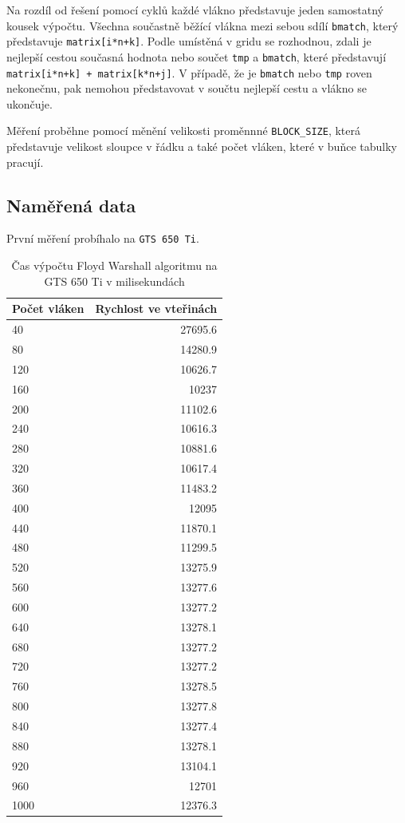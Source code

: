 \documentclass[10pt,a4paper]{article}
\begin{document}
Na rozdíl od řešení pomocí cyklů každé vlákno představuje jeden samostatný kousek výpočtu. Všechna součastně běžící vlákna mezi sebou sdílí \texttt{bmatch}, který představuje \texttt{matrix[i*n+k]}. Podle umístěná v gridu se rozhodnou, zdali je nejlepší cestou současná hodnota nebo součet \texttt{tmp} a \texttt{bmatch}, které představují \texttt{matrix[i*n+k] + matrix[k*n+j]}. V případě, že je \texttt{bmatch} nebo \texttt{tmp} roven nekonečnu, pak nemohou představovat v součtu nejlepší cestu a vlákno se ukončuje.

Měření proběhne pomocí měnění velikosti proměnnné \texttt{BLOCK\_SIZE}, která představuje velikost sloupce v řádku a také počet vláken, které v buňce tabulky pracují.

\subsection{Naměřená data}

První měření probíhalo na \texttt{GTS 650 Ti}. 

\begin{table}[H]
  \centering
	\caption{Čas výpočtu Floyd Warshall algoritmu na GTS 650 Ti v milisekundách}
	\begin{tabular}{| l | r |}
\hline
Počet vláken & Rychlost ve vteřinách \\ \hline
40 & 27695.6 \\ \hline
80 & 14280.9 \\ \hline
120 & 10626.7 \\ \hline
160 & 10237 \\ \hline
200 & 11102.6 \\ \hline
240 & 10616.3 \\ \hline
280 & 10881.6 \\ \hline
320 & 10617.4 \\ \hline
360 & 11483.2 \\ \hline
400 & 12095 \\ \hline
440 & 11870.1 \\ \hline
480 & 11299.5 \\ \hline
520 & 13275.9 \\ \hline
560 & 13277.6 \\ \hline
600 & 13277.2 \\ \hline
640 & 13278.1 \\ \hline
680 & 13277.2 \\ \hline
720 & 13277.2 \\ \hline
760 & 13278.5 \\ \hline
800 & 13277.8 \\ \hline
840 & 13277.4 \\ \hline
880 & 13278.1 \\ \hline
920 & 13104.1 \\ \hline
960 & 12701 \\ \hline
1000 & 12376.3 \\ \hline
	\end{tabular}
  \label{tab:cufl}
\end{table}
\end{document}

